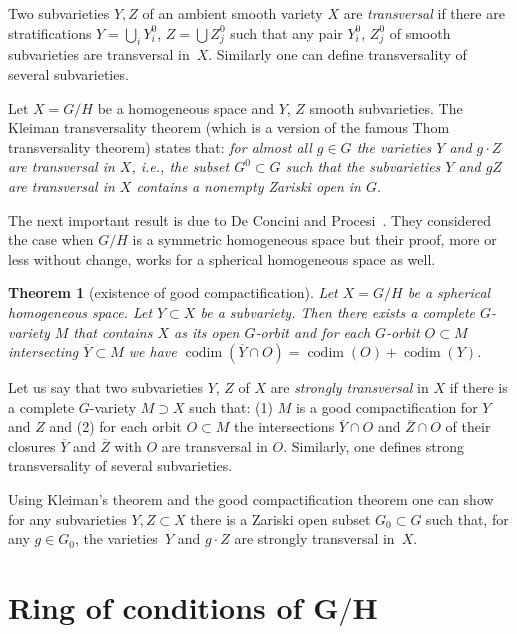 \documentclass[pdftex]{sigma}
\def \codim{\operatorname{codim}}
\numberwithin{equation}{section}
\newtheorem{Th}{Theorem}[section]
\theoremstyle{definition}
\begin{document}
Two subvarieties $Y,Z$ of an ambient smooth variety $X$ are {\it transversal} if there are stratifications $Y=\bigcup_i Y_i^0$, $Z=\bigcup Z_j^0$ such that any pair $Y_i^0$, $Z_j^0$ of smooth subvarieties are transversal in~$X$. Similarly one can define transversality of several subvarieties.

Let $X = G/H$ be a homogeneous space and $Y$, $Z$ smooth subvarieties. The Kleiman transversality theorem (which is a version of the famous Thom transversality theorem) states that: \emph{for almost all $g\in G$ the varieties $Y$ and $g \cdot Z$ are transversal in $X$, i.e., the subset $G^0\subset G$ such that the subvarieties $Y$ and $gZ$ are transversal in $X$ contains a nonempty Zariski open in $G$}.

The next important result is due to De Concini and Procesi~\cite{DP}. They considered the case when $G/H$ is a symmetric homogeneous space but their proof, more or less without change, works for a spherical homogeneous space as well.
\begin{Th}[existence of good compactification] \label{th-exist-good-comp}
Let $X=G/H$ be a spherical homogeneous space. Let $Y \subset X$ be a subvariety. Then there exists a complete $G$-variety $M$ that contains $X$ as its open $G$-orbit and for each $G$-orbit $O\subset M$ intersecting $\overline{Y} \subset M$ we have $\codim(\overline{Y}\cap O) = \codim(O) + \codim(Y)$.
\end{Th}

Let us say that two subvarieties $Y$, $Z$ of $X$ are {\it strongly transversal} in $X$ if there is a complete $G$-variety $M\supset X$ such that: (1) $M$ is a good compactification for $Y$ and $Z$ and (2) for each orbit $O\subset M$ the intersections $\overline Y\cap O$ and $\overline Z\cap O$ of their closures $\overline Y$ and $\overline Z$ with $O$ are transversal in $O$. Similarly, one defines strong transversality of several subvarieties.

Using Kleiman's theorem and the good compactification theorem one can show for any subvarieties $Y,Z\subset X$ there is a Zariski open subset $G_0\subset G$ such that, for any $g \in G_0$, the varieties~$Y$ and $g \cdot Z$ are strongly transversal in~$X$.

\section[Ring of conditions of $G/H$]{Ring of conditions of $\boldsymbol{G/H}$} \label{sec-ring-of-conditions}
\end{document}
